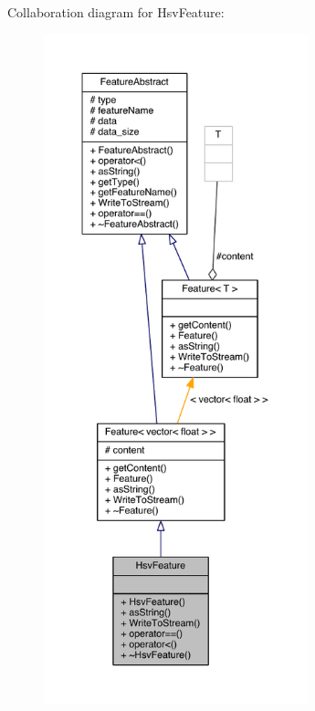 Collaboration diagram for Hsv\+Feature\+:
\nopagebreak
\begin{figure}[H]
\begin{center}
\leavevmode
\includegraphics[height=550pt]{class_hsv_feature__coll__graph}
\end{center}
\end{figure}


